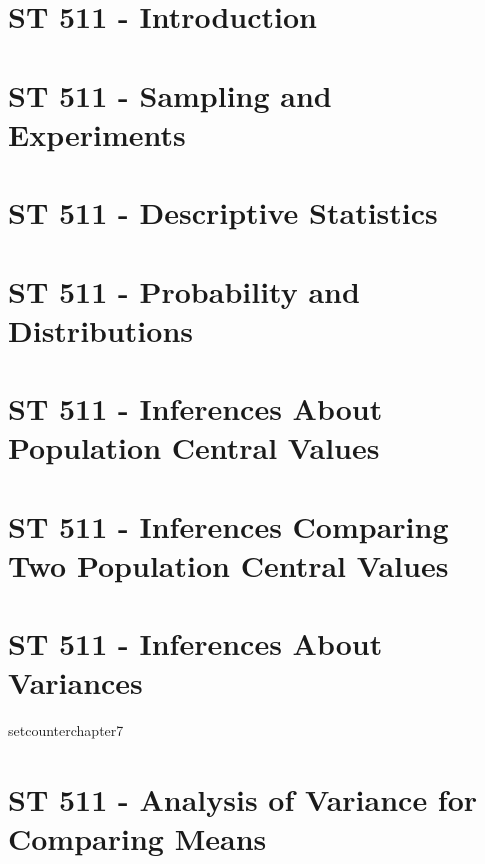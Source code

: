\documentclass{report}
\begin{document}
\setlength{\topmargin}{0pt}
\setlength{\oddsidemargin}{0pt}

\newpage
{}
\setcounter{chapter}{0}
\chapter{ST 511 - Introduction}

\setcounter{chapter}{1}
\chapter{ST 511 - Sampling and Experiments}

\setcounter{chapter}{2}
\chapter{ST 511 - Descriptive Statistics}

\setcounter{chapter}{3}
\chapter{ST 511 - Probability and Distributions}




\setcounter{chapter}{4}
\chapter{ST 511 - Inferences About Population Central Values}

	
\setcounter{chapter}{5}
\chapter{ST 511 - Inferences Comparing Two Population Central Values}

\setcounter{chapter}{6}
\chapter{ST 511 - Inferences About Variances}

setcounter{chapter}{7}
\chapter{ST 511 - Analysis of Variance for Comparing Means}

\end{document}
